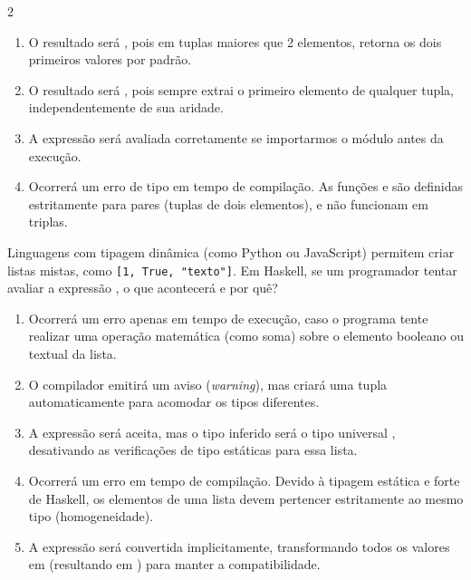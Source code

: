 \documentclass[a4paper,10pt,brazil]{article}
\begin{document}
\begin{multicols}{2}
\begin{enumerate}
  \item O resultado será , pois em tuplas maiores que 2 elementos,  retorna os dois primeiros valores por padrão.

  \item O resultado será , pois  sempre extrai o primeiro elemento de qualquer tupla, independentemente de sua aridade.

  \item A expressão será avaliada corretamente se importarmos o módulo  antes da execução.

  \item Ocorrerá um erro de tipo em tempo de compilação. As funções  e  são definidas estritamente para pares (tuplas de dois elementos), e não funcionam em triplas.


\end{enumerate}

Linguagens com tipagem dinâmica (como Python ou JavaScript) permitem criar listas mistas, como \texttt{[1, True, "texto"]}. Em Haskell, se um programador tentar avaliar a expressão , o que acontecerá e por quê?

\begin{enumerate}
  \item Ocorrerá um erro apenas em tempo de execução, caso o programa tente realizar uma operação matemática (como soma) sobre o elemento booleano ou textual da lista.

  \item O compilador emitirá um aviso (\emph{warning}), mas criará uma tupla automaticamente para acomodar os tipos diferentes.

  \item A expressão será aceita, mas o tipo inferido será o tipo universal , desativando as verificações de tipo estáticas para essa lista.

  \item Ocorrerá um erro em tempo de compilação. Devido à tipagem estática e forte de Haskell, os elementos de uma lista devem pertencer estritamente ao mesmo tipo (homogeneidade).

  \item A expressão será convertida implicitamente, transformando todos os valores em  (resultando em ) para manter a compatibilidade.



\end{enumerate}
\end{multicols}
\end{document}
